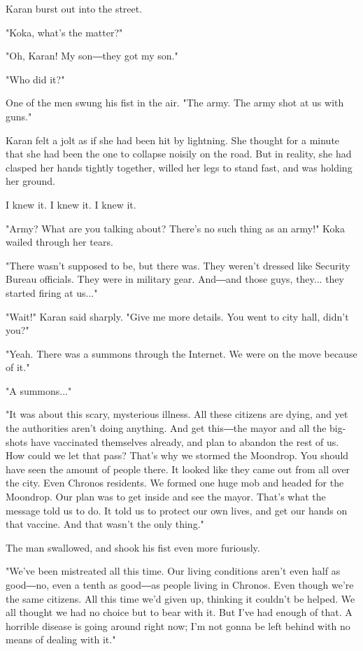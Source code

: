Karan burst out into the street.

"Koka, what's the matter?"

"Oh, Karan! My son―they got my son."

"Who did it?"

One of the men swung his fist in the air. "The army. The army shot at us
with guns."

Karan felt a jolt as if she had been hit by lightning. She thought for a
minute that she had been the one to collapse noisily on the road. But in
reality, she had clasped her hands tightly together, willed her legs to
stand fast, and was holding her ground.

I knew it. I knew it. I knew it.

"Army? What are you talking about? There's no such thing as an army!"
Koka wailed through her tears.

"There wasn't supposed to be, but there was. They weren't dressed like
Security Bureau officials. They were in military gear. And―and those
guys, they... they started firing at us..."

"Wait!" Karan said sharply. "Give me more details. You went to city
hall, didn't you?"

"Yeah. There was a summons through the Internet. We were on the move
because of it."

"A summons..."

"It was about this scary, mysterious illness. All these citizens are
dying, and yet the authorities aren't doing anything. And get this―the
mayor and all the big-shots have vaccinated themselves already, and plan
to abandon the rest of us. How could we let that pass? That's why we
stormed the Moondrop. You should have seen the amount of people there.
It looked like they came out from all over the city. Even Chronos
residents. We formed one huge mob and headed for the Moondrop. Our plan
was to get inside and see the mayor. That's what the message told us to
do. It told us to protect our own lives, and get our hands on that
vaccine. And that wasn't the only thing."

The man swallowed, and shook his fist even more furiously.

"We've been mistreated all this time. Our living conditions aren't even
half as good―no, even a tenth as good―as people living in Chronos. Even
though we're the same citizens. All this time we'd given up, thinking it
couldn't be helped. We all thought we had no choice but to bear with it.
But I've had enough of that. A horrible disease is going around right
now; I'm not gonna be left behind with no means of dealing with it."

